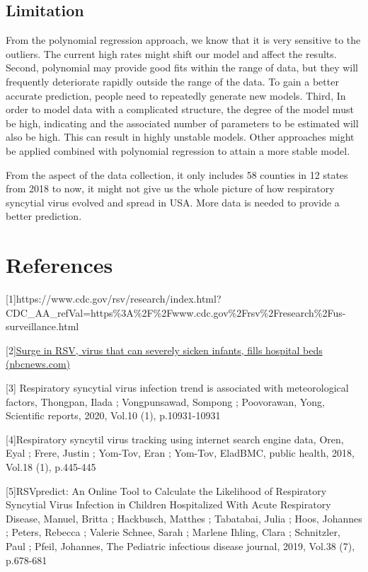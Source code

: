 \documentclass[
  letterpaper,
  DIV=11,
  numbers=noendperiod]{scrreport}
\begin{document}
\hypertarget{limitation}{%
\section{Limitation}\label{limitation}}

From the polynomial regression approach, we know that it is very
sensitive to the outliers. The current high rates might shift our model
and affect the results. Second, polynomial may provide good fits within
the range of data, but they will frequently deteriorate rapidly outside
the range of the data. To gain a better accurate prediction, people need
to repeatedly generate new models. Third, In order to model data with a
complicated structure, the degree of the model must be high, indicating
and the associated number of parameters to be estimated will also be
high. This can result in highly unstable models. Other approaches might
be applied combined with polynomial regression to attain a more stable
model.

From the aspect of the data collection, it only includes 58 counties in
12 states from 2018 to now, it might not give us the whole picture of
how respiratory syncytial virus evolved and spread in USA. More data is
needed to provide a better prediction.


\hypertarget{references}{%
\chapter{References}\label{references}}

{[}1{]}https://www.cdc.gov/rsv/research/index.html?CDC\_AA\_refVal=https\%3A\%2F\%2Fwww.cdc.gov\%2Frsv\%2Fresearch\%2Fus-surveillance.html

{[}2{]}\href{https://www.nbcnews.com/health/health-news/surge-rsv-virus-fills-hospitals-can-severely-sicken-babies-rcna52082}{Surge
in RSV, virus that can severely sicken infants, fills hospital beds
(nbcnews.com)}

{[}3{]} Respiratory syncytial virus infection trend is associated with
meteorological factors, Thongpan, Ilada ; Vongpunsawad, Sompong ;
Poovorawan, Yong, Scientific reports, 2020, Vol.10 (1), p.10931-10931

{[}4{]}Respiratory syncytil virus tracking using internet search engine
data, Oren, Eyal ; Frere, Justin ; Yom-Tov, Eran ; Yom-Tov, EladBMC,
public health, 2018, Vol.18 (1), p.445-445

{[}5{]}RSVpredict: An Online Tool to Calculate the Likelihood of
Respiratory Syncytial Virus Infection in Children Hospitalized With
Acute Respiratory Disease, Manuel, Britta ; Hackbusch, Matthes ;
Tabatabai, Julia ; Hoos, Johannes ; Peters, Rebecca ; Valerie Schnee,
Sarah ; Marlene Ihling, Clara ; Schnitzler, Paul ; Pfeil, Johannes, The
Pediatric infectious disease journal, 2019, Vol.38 (7), p.678-681
\end{document}
